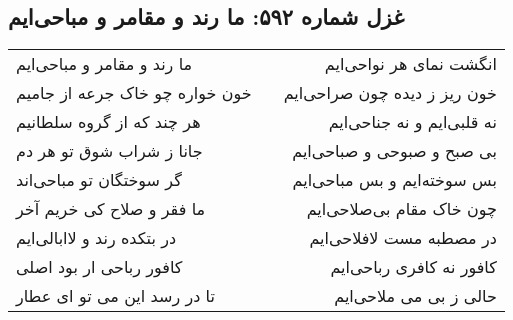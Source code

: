 \begin{center}
\section*{غزل شماره ۵۹۲: ما رند و مقامر و مباحی‌ایم}
\label{sec:592}
\begin{longtable}{l p{0.5cm} r}
ما رند و مقامر و مباحی‌ایم
&&
انگشت نمای هر نواحی‌ایم
\\
خون خواره چو خاک جرعه از جامیم
&&
خون ریز ز دیده چون صراحی‌ایم
\\
هر چند که از گروه سلطانیم
&&
نه قلبی‌ایم و نه جناحی‌ایم
\\
جانا ز شراب شوق تو هر دم
&&
بی صبح و صبوحی و صباحی‌ایم
\\
گر سوختگان تو مباحی‌اند
&&
بس سوخته‌ایم و بس مباحی‌ایم
\\
ما فقر و صلاح کی خریم آخر
&&
چون خاک مقام بی‌صلاحی‌ایم
\\
در بتکده رند و لاابالی‌ایم
&&
در مصطبه مست لافلاحی‌ایم
\\
کافور رباحی ار بود اصلی
&&
کافور نه کافری رباحی‌ایم
\\
تا در رسد این می تو ای عطار
&&
حالی ز بی می ملاحی‌ایم
\\
\end{longtable}
\end{center}
